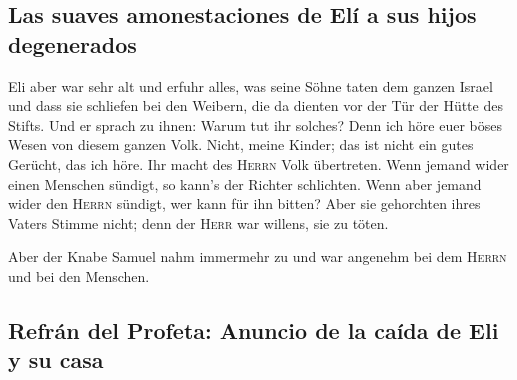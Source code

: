 \hypertarget{las-suaves-amonestaciones-de-eluxed-a-sus-hijos-degenerados}{%
\subsection{Las suaves amonestaciones de Elí a sus hijos
degenerados}\label{las-suaves-amonestaciones-de-eluxed-a-sus-hijos-degenerados}}

 Eli aber war sehr alt und erfuhr alles, was seine Söhne
taten dem ganzen Israel und dass sie schliefen bei den Weibern, die da
dienten vor der Tür der Hütte des Stifts.  Und er sprach
zu ihnen: Warum tut ihr solches? Denn ich höre euer böses Wesen von
diesem ganzen Volk.  Nicht, meine Kinder; das ist nicht
ein gutes Gerücht, das ich höre. Ihr macht des \textsc{Herrn} Volk
übertreten.  Wenn jemand wider einen Menschen sündigt, so
kann's der Richter schlichten. Wenn aber jemand wider den \textsc{Herrn}
sündigt, wer kann für ihn bitten? Aber sie gehorchten ihres Vaters
Stimme nicht; denn der \textsc{Herr} war willens, sie zu töten.

 Aber der Knabe Samuel nahm immermehr zu und war angenehm
bei dem \textsc{Herrn} und bei den Menschen.

\hypertarget{refruxe1n-del-profeta-anuncio-de-la-cauxedda-de-eli-y-su-casa}{%
\subsection{Refrán del Profeta: Anuncio de la caída de Eli y su
casa}\label{refruxe1n-del-profeta-anuncio-de-la-cauxedda-de-eli-y-su-casa}}

